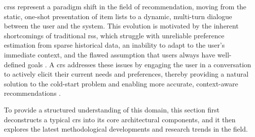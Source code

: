 \aclp{crs} represent a paradigm shift in the field of recommendation, moving from the static, one-shot presentation of item lists to a dynamic, multi-turn dialogue between the user and the system. This evolution is motivated by the inherent shortcomings of traditional \acp{rs}, which struggle with unreliable preference estimation from sparse historical data, an inability to adapt to the user's immediate context, and the flawed assumption that users always have well-defined goals \cite{SOTA-CRS-SURVEY}. A \ac{crs} addresses these issues by engaging the user in a conversation to actively elicit their current needs and preferences, thereby providing a natural solution to the cold-start problem and enabling more accurate, context-aware recommendations \cite{SOTA-TOWARDS-CRS}.

To provide a structured understanding of this domain, this section first deconstructs a typical \ac{crs} into its core architectural components, and it then explores the latest methodological developments and research trends in the field.